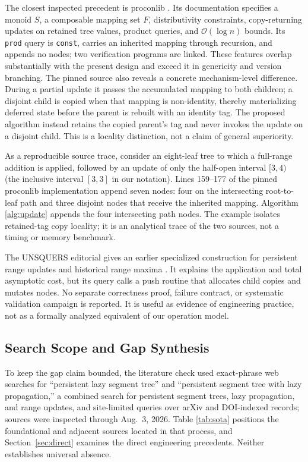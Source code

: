 \documentclass[conference]{IEEEtran}
\begin{document}
The closest inspected precedent is proconlib \cite{proconlib2026persistent}. Its documentation
specifies a monoid $S$, a composable mapping set $F$, distributivity constraints, copy-returning
updates on retained tree values, product queries, and $\mathcal{O}(\log n)$ bounds. Its
\texttt{prod} query is \texttt{const}, carries an inherited mapping through recursion, and appends
no nodes; two verification programs are linked. These features overlap substantially with the
present design and exceed it in genericity and version branching. The pinned source also reveals
a concrete mechanism-level difference. During a partial update it passes the accumulated mapping
to both children; a disjoint child is copied when that mapping is non-identity, thereby
materializing deferred state before the parent is rebuilt with an identity tag. The proposed
algorithm instead retains the copied parent's tag and never invokes the update on a disjoint
child. This is a locality distinction, not a claim of general superiority.

As a reproducible source trace, consider an eight-leaf tree to which a full-range addition is
applied, followed by an update of only the half-open interval $[3,4)$ (the inclusive interval
$[3,3]$ in our notation). Lines
159--177 of the pinned proconlib implementation append seven nodes: four on the intersecting
root-to-leaf path and three disjoint nodes that receive the inherited mapping. Algorithm
\ref{alg:update} appends the four intersecting path nodes. The example isolates retained-tag copy
locality; it is an analytical trace of the two sources, not a timing or memory benchmark.

The UNSQUERS editorial gives an earlier specialized construction for persistent range updates and
historical range maxima \cite{orap2020unsquers}. It explains the application and total asymptotic
cost, but its query calls a push routine that allocates child copies and mutates nodes. No separate
correctness proof, failure contract, or systematic validation campaign is reported. It is useful
as evidence of engineering practice, not as a formally analyzed equivalent of our operation
model.

\subsection{Search Scope and Gap Synthesis}
\label{sec:scope}

To keep the gap claim bounded, the literature check used exact-phrase web searches for
``persistent lazy segment tree'' and ``persistent segment tree with lazy propagation,'' a combined
search for persistent segment trees, lazy propagation, and range updates, and site-limited queries
over arXiv and DOI-indexed records; sources were inspected through Aug.~3, 2026. Table
\ref{tab:sota} positions the foundational and adjacent sources located in that process, and
Section~\ref{sec:direct} examines the direct engineering precedents. Neither establishes
universal absence.
\end{document}
